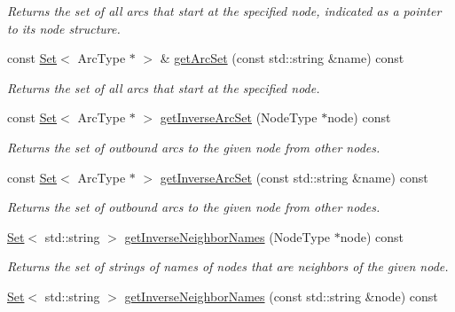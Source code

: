 \begin{DoxyCompactItemize}
\begin{DoxyCompactList}\small\item\em Returns the set of all arcs that start at the specified node, indicated as a pointer to its node structure. \end{DoxyCompactList}\item 
const \mbox{\hyperlink{classstanfordcpplib_1_1collections_1_1GenericSet}{Set}}$<$ Arc\+Type $\ast$ $>$ \& \mbox{\hyperlink{classGraph_a31b9e2056ee2d66a7ea9feb02f016e8d}{get\+Arc\+Set}} (const std\+::string \&name) const
\begin{DoxyCompactList}\small\item\em Returns the set of all arcs that start at the specified node. \end{DoxyCompactList}\item 
const \mbox{\hyperlink{classstanfordcpplib_1_1collections_1_1GenericSet}{Set}}$<$ Arc\+Type $\ast$ $>$ \mbox{\hyperlink{classGraph_ad5fd149800cd46aae497b05b46059b63}{get\+Inverse\+Arc\+Set}} (Node\+Type $\ast$node) const
\begin{DoxyCompactList}\small\item\em Returns the set of outbound arcs to the given node from other nodes. \end{DoxyCompactList}\item 
const \mbox{\hyperlink{classstanfordcpplib_1_1collections_1_1GenericSet}{Set}}$<$ Arc\+Type $\ast$ $>$ \mbox{\hyperlink{classGraph_a2cfe12e71ca594736a1e329461cff024}{get\+Inverse\+Arc\+Set}} (const std\+::string \&name) const
\begin{DoxyCompactList}\small\item\em Returns the set of outbound arcs to the given node from other nodes. \end{DoxyCompactList}\item 
\mbox{\hyperlink{classstanfordcpplib_1_1collections_1_1GenericSet}{Set}}$<$ std\+::string $>$ \mbox{\hyperlink{classGraph_aa9eceee00e824ea4852449fa3de61e82}{get\+Inverse\+Neighbor\+Names}} (Node\+Type $\ast$node) const
\begin{DoxyCompactList}\small\item\em Returns the set of strings of names of nodes that are neighbors of the given node. \end{DoxyCompactList}\item 
\mbox{\hyperlink{classstanfordcpplib_1_1collections_1_1GenericSet}{Set}}$<$ std\+::string $>$ \mbox{\hyperlink{classGraph_ac3dc36bc1eb0f249180cfe78bce6e7a2}{get\+Inverse\+Neighbor\+Names}} (const std\+::string \&node) const

\end{DoxyCompactItemize}
